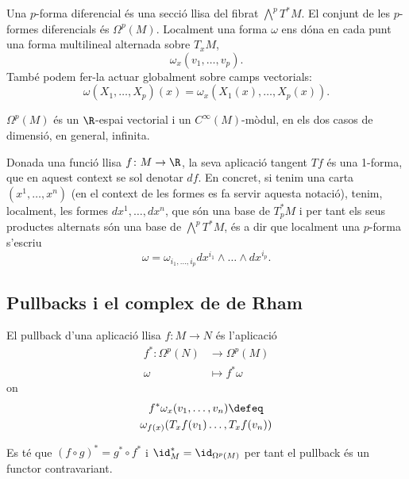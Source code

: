 \documentclass[12pt,twocolumn]{article}
\begin{document}
\begin{definition}
	Una \( p \)-forma diferencial és una secció llisa del fibrat \( \bigwedge^p T^\ast M \).
	El conjunt de les \( p \)-formes diferencials és \( \Omega^p(M) \). Localment una forma
	\( \omega \) ens dóna en cada punt una forma multilineal alternada sobre \( T_x M \),
	\begin{equation*}
		\omega_x(v_1, \dots, v_p).
	\end{equation*}
	També podem fer-la actuar globalment sobre camps vectorials:
	\begin{equation*}
		\omega(X_1, \dots, X_p)(x) = \omega_x(X_1(x), \dots, X_p(x)).
	\end{equation*}
\end{definition}
\begin{observation}
	\( \Omega^p(M) \) és un \( \R \)-espai vectorial i un	\( C^{\infty}(M) \)-mòdul, en els
	dos casos de dimensió, en general, infinita.	
\end{observation}
\begin{example}[Gradients]
	Donada una funció llisa \( f \colon M \to \R \), la seva aplicació tangent \( Tf \) és
	una 1-forma, que en aquest context se sol denotar \( df \). En concret, si tenim una
	carta \( (x^1, \dots,x^n) \) (en el context de les formes es fa servir aquesta notació),
	tenim, localment, les formes \( dx^1, \dots, dx^n \), que són una base de \( T_p^\ast M
	\) i per tant els seus productes alternats són una base de \( \bigwedge^p T^\ast M \), és
	a dir que localment una \( p \)-forma s'escriu
	\begin{equation*}
		\omega = \omega_{i_1, \dots, i_p} dx^{i_1} \wedge \dots \wedge dx^{i_p}.
	\end{equation*}
\end{example}

\subsection{Pullbacks i el complex de de Rham}
\begin{definition}[Pullback]
	El pullback d'una aplicació llisa \( f \colon M \to N \) és l'aplicació
	\begin{align*}
		f^\ast \colon \Omega^p(N) & \to \Omega^p(M) \\
		\omega & \mapsto f^\ast \omega
	\end{align*}
	on
	\begin{gather*}
		f^\ast \omega_x(v_1, \dots, v_n) \defeq \\
		 \omega_{f(x)}(T_xf(v_1) \dots, T_xf(v_n)) 
	\end{gather*}
\end{definition}
\begin{proposition}
	Es té que \( (f \circ g)^\ast = g^\ast \circ f^\ast \) i \( \id_M^\ast =
	\id_{\Omega^p(M)} \) per tant el pullback és un functor contravariant. 
\end{proposition}
\end{document}

